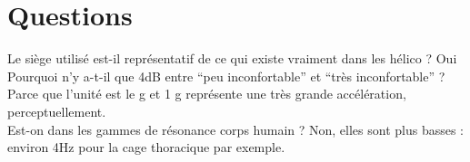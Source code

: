 \documentclass[12pt]{article}
\begin{document}
\section{Questions}
Le siège utilisé est-il représentatif de ce qui existe vraiment dans les hélico ? Oui\\


Pourquoi n'y a-t-il que 4dB entre ``peu inconfortable'' et ``très inconfortable'' ? Parce que l'unité est le g et 1 g représente une très grande accélération, perceptuellement.\\

Est-on dans les gammes de résonance corps humain ? Non, elles sont plus basses : environ 4Hz pour la cage thoracique par exemple.


%
%
\end{document}
